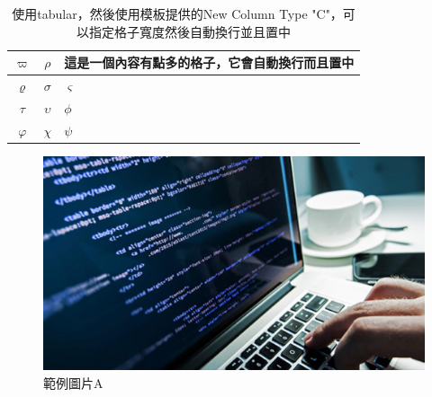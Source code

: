 \begin{table}[ht]
    \centering
    \renewcommand{\arraystretch}{1.2}

    \begin{tabular}{ c | c | C{10em}}
        $\varpi $   & $\rho  $      & 這是一個內容有點多的格子，它會自動換行而且置中 \\ \hline\hline
        $\varrho  $ & $\sigma  $    & $\varsigma  $           \\\hline
        $\tau  $    & $\upsilon   $ & $\phi   $               \\\hline
        $\varphi $  & $\chi   $     & $\psi   $               \\\hline
    \end{tabular}

    \renewcommand{\arraystretch}{1}

    \caption{使用tabular，然後使用模板提供的New Column Type "C"，可以指定格子寬度然後自動換行並且置中}
    \label{tab:tabexample3}
\end{table}

\begin{figure}[hpbt]
    \centering
    \includegraphics[width=\textwidth]{Figures/computer_science.jpg}
    \caption{範例圖片A}
    \label{fig:figexample}
\end{figure}

